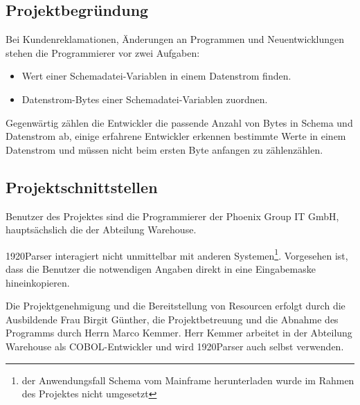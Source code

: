 \subsection{Projektbegründung}
\label{sec:Projektbegruendung}
Bei Kundenreklamationen, Änderungen an Programmen und Neuentwicklungen stehen die
Programmierer vor zwei Aufgaben:

\begin{itemize}
\item Wert einer Schemadatei-Variablen in einem Datenstrom finden.
\item Datenstrom-Bytes einer Schemadatei-Variablen zuordnen.
\end{itemize}

Gegenwärtig zählen die Entwickler die passende Anzahl von Bytes in Schema und Datenstrom ab, einige erfahrene Entwickler erkennen bestimmte Werte in einem Datenstrom und müssen nicht beim ersten Byte anfangen zu zählenzählen.


\subsection{Projektschnittstellen}
\label{sec:Projektschnittstellen}
Benutzer des Projektes sind die Programmierer der Phoenix Group IT GmbH, hauptsächslich die der Abteilung Warehouse.

1920Parser interagiert nicht unmittelbar mit anderen Systemen\footnote{der Anwendungsfall Schema vom Mainframe herunterladen wurde im Rahmen des Projektes nicht umgesetzt}. Vorgesehen ist, dass die Benutzer die notwendigen Angaben direkt in eine Eingabemaske hineinkopieren.

Die Projektgenehmigung und die Bereitstellung von Resourcen erfolgt durch die Ausbildende Frau Birgit Günther, die Projektbetreuung und die Abnahme des Programms durch Herrn Marco Kemmer. Herr Kemmer arbeitet in der Abteilung Warehouse als COBOL-Entwickler und wird 1920Parser auch selbst verwenden.

